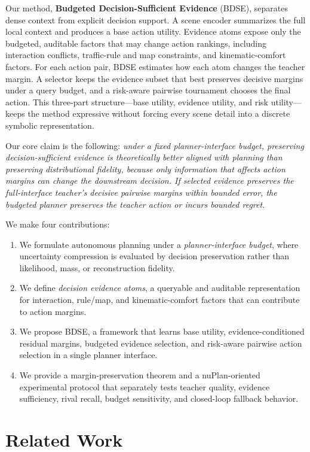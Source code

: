 \documentclass{article}
\begin{document}
Our method, \textbf{Budgeted Decision-Sufficient Evidence} (BDSE), separates dense context from explicit decision support. A scene encoder summarizes the full local context and produces a base action utility. Evidence atoms expose only the budgeted, auditable factors that may change action rankings, including interaction conflicts, traffic-rule and map constraints, and kinematic-comfort factors. For each action pair, BDSE estimates how each atom changes the teacher margin. A selector keeps the evidence subset that best preserves decisive margins under a query budget, and a risk-aware pairwise tournament chooses the final action. This three-part structure---base utility, evidence utility, and risk utility---keeps the method expressive without forcing every scene detail into a discrete symbolic representation.

Our core claim is the following: \emph{under a fixed planner-interface budget, preserving decision-sufficient evidence is theoretically better aligned with planning than preserving distributional fidelity, because only information that affects action margins can change the downstream decision. If selected evidence preserves the full-interface teacher's decisive pairwise margins within bounded error, the budgeted planner preserves the teacher action or incurs bounded regret.}

We make four contributions:
\begin{enumerate}[leftmargin=*]
    \item We formulate autonomous planning under a \emph{planner-interface budget}, where uncertainty compression is evaluated by decision preservation rather than likelihood, mass, or reconstruction fidelity.
    \item We define \emph{decision evidence atoms}, a queryable and auditable representation for interaction, rule/map, and kinematic-comfort factors that can contribute to action margins.
    \item We propose BDSE, a framework that learns base utility, evidence-conditioned residual margins, budgeted evidence selection, and risk-aware pairwise action selection in a single planner interface.
    \item We provide a margin-preservation theorem and a nuPlan-oriented experimental protocol that separately tests teacher quality, evidence sufficiency, rival recall, budget sensitivity, and closed-loop fallback behavior.
\end{enumerate}

\section{Related Work}
\end{document}
